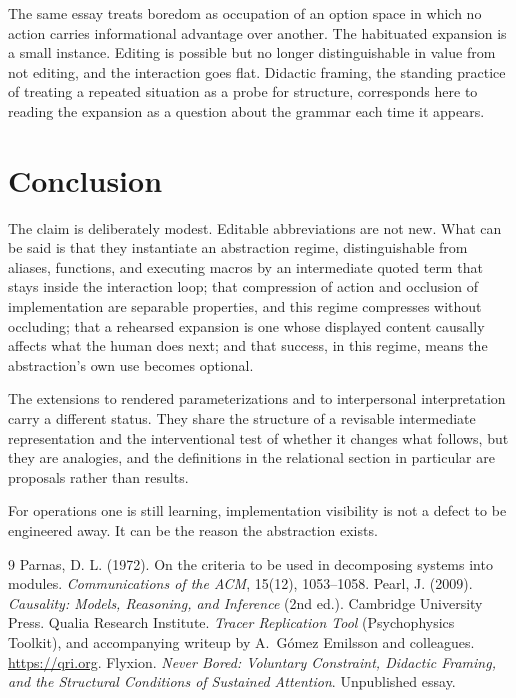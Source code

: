 \documentclass[11pt]{article}
\theoremstyle{remark}
\begin{document}
The same essay treats boredom as occupation of an option space in which no action carries informational advantage over another. The habituated expansion is a small instance. Editing is possible but no longer distinguishable in value from not editing, and the interaction goes flat. Didactic framing, the standing practice of treating a repeated situation as a probe for structure, corresponds here to reading the expansion as a question about the grammar each time it appears.

\section{Conclusion}

The claim is deliberately modest. Editable abbreviations are not new. What can be said is that they instantiate an abstraction regime, distinguishable from aliases, functions, and executing macros by an intermediate quoted term that stays inside the interaction loop; that compression of action and occlusion of implementation are separable properties, and this regime compresses without occluding; that a rehearsed expansion is one whose displayed content causally affects what the human does next; and that success, in this regime, means the abstraction's own use becomes optional.

The extensions to rendered parameterizations and to interpersonal interpretation carry a different status. They share the structure of a revisable intermediate representation and the interventional test of whether it changes what follows, but they are analogies, and the definitions in the relational section in particular are proposals rather than results.

For operations one is still learning, implementation visibility is not a defect to be engineered away. It can be the reason the abstraction exists.

\begin{thebibliography}{9}
 Parnas, D. L. (1972). On the criteria to be used in decomposing systems into modules. \emph{Communications of the ACM}, 15(12), 1053--1058.
 Pearl, J. (2009). \emph{Causality: Models, Reasoning, and Inference} (2nd ed.). Cambridge University Press.
 Qualia Research Institute. \emph{Tracer Replication Tool} (Psychophysics Toolkit), and accompanying writeup by A.\ G\'omez Emilsson and colleagues. \url{https://qri.org}.
 Flyxion. \emph{Never Bored: Voluntary Constraint, Didactic Framing, and the Structural Conditions of Sustained Attention}. Unpublished essay.
\end{thebibliography}
\end{document}
